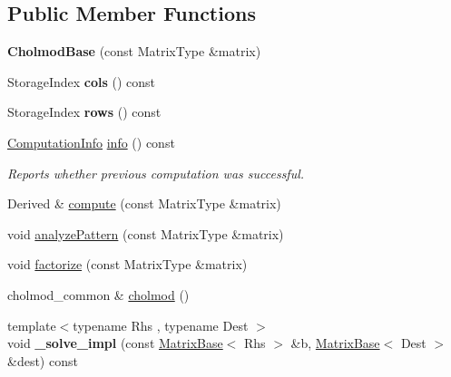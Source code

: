 \subsection*{Public Member Functions}
\begin{DoxyCompactItemize}
\item 
\mbox{\label{class_eigen_1_1_cholmod_base_a1b54c3f3d0315a6c581c6ded51076bf6}} 
{\bfseries Cholmod\+Base} (const Matrix\+Type \&matrix)
\item 
\mbox{\label{class_eigen_1_1_cholmod_base_aa0b16898522cca48af94e96f8a27666d}} 
Storage\+Index {\bfseries cols} () const
\item 
\mbox{\label{class_eigen_1_1_cholmod_base_a849383115475b8bb4da3cfcc86a64e9e}} 
Storage\+Index {\bfseries rows} () const
\item 
\mbox{\hyperlink{group__enums_ga85fad7b87587764e5cf6b513a9e0ee5e}{Computation\+Info}} \mbox{\hyperlink{class_eigen_1_1_cholmod_base_ada4cc43c64767d186fcb8997440cc753}{info}} () const
\begin{DoxyCompactList}\small\item\em Reports whether previous computation was successful. \end{DoxyCompactList}\item 
Derived \& \mbox{\hyperlink{class_eigen_1_1_cholmod_base_abaf5be01b1e3035a4de0b19f5b63549e}{compute}} (const Matrix\+Type \&matrix)
\item 
void \mbox{\hyperlink{class_eigen_1_1_cholmod_base_a5ac967e9f4ccfc43ca9e610b89232c24}{analyze\+Pattern}} (const Matrix\+Type \&matrix)
\item 
void \mbox{\hyperlink{class_eigen_1_1_cholmod_base_a5bd9c9ec4d1c15f202a6c66b5e9ef37b}{factorize}} (const Matrix\+Type \&matrix)
\item 
cholmod\+\_\+common \& \mbox{\hyperlink{class_eigen_1_1_cholmod_base_a6a85bf52d6aa480240a64f277d7f96c6}{cholmod}} ()
\item 
\mbox{\label{class_eigen_1_1_cholmod_base_ad7002ebd76d3a5e6e86ab595d6cecc57}} 
{\footnotesize template$<$typename Rhs , typename Dest $>$ }\\void {\bfseries \+\_\+solve\+\_\+impl} (const \mbox{\hyperlink{class_eigen_1_1_matrix_base}{Matrix\+Base}}$<$ Rhs $>$ \&b, \mbox{\hyperlink{class_eigen_1_1_matrix_base}{Matrix\+Base}}$<$ Dest $>$ \&dest) const

\end{DoxyCompactItemize}

